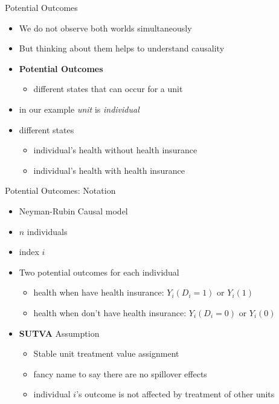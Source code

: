 \documentclass{beamer}
\begin{document}
	
	
	
	\begin{frame}{Potential Outcomes}
		\begin{itemize}
			\item We do not observe both worlds simultaneously
			\item But thinking about them helps to understand causality
			\item \textbf{Potential Outcomes}
			\begin{itemize}
				\item different states that can occur for a unit 
			\end{itemize}
			\item in our example \textit{unit} is \textit{individual}
			\item different states
			\begin{itemize}
				\item individual's health without health insurance
				\item individual's health with health insurance
			\end{itemize}
		\end{itemize}
	\end{frame}
	
	\begin{frame}{Potential Outcomes: Notation}
		\begin{itemize}
			\item Neyman-Rubin Causal model
			\item $n$ individuals 
			\item index $i$
			\item Two potential outcomes for each individual
			\begin{itemize}
				\item health when have health insurance: $Y_i(D_i=1)$ or $Y_i(1)$
				\item health when don't have health insurance: $Y_i(D_i=0)$ or $Y_i(0)$
			\end{itemize}
			\item \textbf{SUTVA} Assumption
			\begin{itemize}
				\item Stable unit treatment value assignment
				\item fancy name to say there are no spillover effects
				\item individual $i$'s outcome is not affected by treatment of other units
			\end{itemize}
		\end{itemize}
	\end{frame}
	
\end{document}

